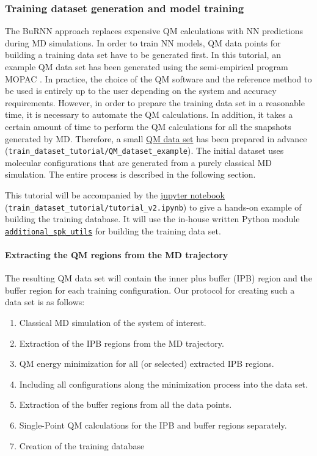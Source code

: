 \subsubsection{Training dataset generation and model training}
The BuRNN approach replaces expensive QM calculations with NN predictions during MD simulations. In order to train NN models, QM data points for building a training data set have to be generated first. In this tutorial, an example QM data set has been generated using the semi-empirical program MOPAC \cite{Stewart1990MOPAC, Stewart2013MOPAC}. In practice, the choice of the QM software and the reference method to be used is entirely up to the user depending on the system and accuracy requirements. However, in order to prepare the training data set in a reasonable time, it is necessary to automate the QM calculations. In addition, it takes a certain amount of time to perform the QM calculations for all the snapshots generated by MD. Therefore, a small \href{https://github.com/LierB/gromos_tutorial_livecoms/tree/burnn_tutorial_rc/tutorial_files/t_06/train_dataset_tutorial/QM_dataset_example}{QM data set} has been prepared in advance (\texttt{train\_dataset\_tutorial/QM\_dataset\_example}). The initial dataset uses molecular configurations that are generated from a purely classical MD simulation. The entire process is described in the following section.


This tutorial will be accompanied by the \href{https://github.com/LierB/gromos_tutorial_livecoms/blob/burnn_tutorial_rc/tutorial_files/t_06/train_dataset_tutorial/tutorial_v2.ipynb}{jupyter notebook} (\texttt{train\_dataset\_tutorial/tutorial\_v2.ipynb}) to give a hands-on example of building the training database. It will use the in-house written Python module \href{https://github.com/LierB/gromos_tutorial_livecoms/blob/burnn_tutorial_rc/tutorial_files/t_06/train_dataset_tutorial/additional_spk_utils.py}{\texttt{additional\_spk\_utils}} for building the training data set.


\paragraph{Extracting the QM regions from the MD trajectory}
The resulting QM data set will contain the inner plus buffer (IPB) region and the buffer region for each training configuration. Our protocol for creating such a data set is as follows: 
\begin{enumerate}
    \item Classical MD simulation of the system of interest.
    \item Extraction of the IPB regions from the MD trajectory.
    \item QM energy minimization for all (or selected) extracted IPB regions.
    \item Including all configurations along the minimization process into the data set.
    \item Extraction of the buffer regions from all the data points.
    \item Single-Point QM calculations for the IPB and buffer regions separately.
    \item Creation of the training database
\end{enumerate}


